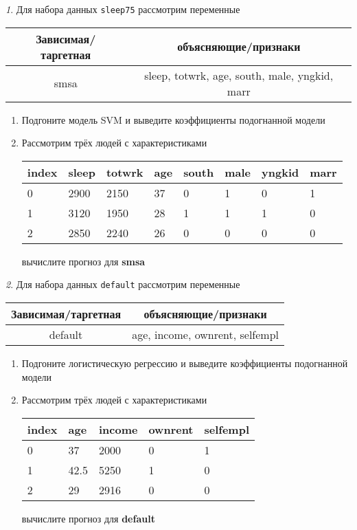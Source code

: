 \documentclass[12pt]{article}
\theoremstyle{remark}
\newtheorem{exercise}{}[section]
\begin{document}
\begin{exercise}
Для набора данных \texttt{sleep75} рассмотрим переменные

\begin{center}
	\begin{tabular}{|c|c|} \hline
		Зависимая/таргетная & объясняющие/признаки \\ \hline
		smsa & sleep, totwrk, age, south, male, yngkid, marr \\ \hline
	\end{tabular}
\end{center}

\begin{enumerate}
	\item Подгоните модель SVM и выведите коэффициенты подогнанной модели
	\item Рассмотрим трёх людей с характеристиками
	\begin{center}
		\begin{tabular}{|l||l|l|l|l|l|l|l|}\hline
			index & sleep & totwrk & age & south & male & yngkid & marr \\ \hline\hline
			0 & 2900 & 2150 & 37 & 0 & 1 &  0 & 1 \\
			1 & 3120 & 1950 & 28 & 1 & 1 &  1 & 0 \\
			2 & 2850 & 2240 & 26 & 0 & 0 &  0 & 0 \\ \hline
		\end{tabular}
	\end{center}
	вычислите прогноз для \textbf{smsa} 
\end{enumerate}
\end{exercise}

\begin{exercise}
Для набора данных \texttt{default} рассмотрим переменные

\begin{center}
	\begin{tabular}{|c|c|} \hline
		Зависимая/таргетная & объясняющие/признаки \\ \hline
		default & age, income, ownrent, selfempl \\ \hline
	\end{tabular}
\end{center}

\begin{enumerate}
	\item Подгоните логистическую регрессию и выведите коэффициенты подогнанной модели
	\item Рассмотрим трёх людей с характеристиками
	\begin{center}
		\begin{tabular}{|l||l|l|l|l|}\hline
			index & age & income & ownrent & selfempl  \\ \hline\hline
			0 & 37 & 2000 & 0 & 1  \\
			1 & 42.5 & 5250 & 1 & 0  \\
			2 & 29 & 2916 & 0 & 0  \\ \hline
		\end{tabular}
	\end{center}
	вычислите прогноз для \textbf{default} 
\end{enumerate}
\end{exercise}
\end{document}
